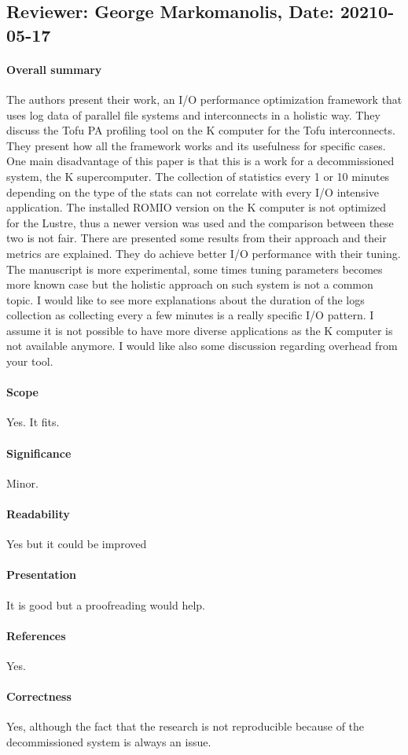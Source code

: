 \documentclass{jhps}
\begin{document}
                   
\subsection*{Reviewer: George Markomanolis, Date: 20210-05-17}
\paragraph{Overall summary}

The authors present their work, an I/O performance optimization framework that uses log data of parallel file systems and interconnects in a holistic way. They discuss the Tofu PA profiling tool on the K computer for the Tofu interconnects. They present how all the framework works and its usefulness for specific cases. One main disadvantage of this paper is that this is a work for a decommissioned system, the K supercomputer. The collection of statistics every 1 or 10 minutes depending on the type of the stats can not correlate with every I/O intensive application. The installed ROMIO version on the K computer is not optimized for the Lustre, thus a newer version was used and the comparison between these two is not fair. There are presented some results from their approach and their metrics are explained. They do achieve better I/O performance with their tuning.
The manuscript is more experimental, some times tuning parameters becomes more known case but the holistic approach on such system is not a common topic. I would like to see more explanations about the duration of the logs collection as collecting every a few minutes is a really specific I/O pattern. I assume it is not possible to have more diverse applications as the K computer is not available anymore. I would like also some discussion regarding overhead from your tool.
\paragraph{Scope}   %
Yes. It fits.
\paragraph{Significance}   %
Minor.
\paragraph{Readability}   %
Yes but it could be improved
\paragraph{Presentation}
It is good but a proofreading would help.
\paragraph{References}   %
Yes.
\paragraph{Correctness}   %
Yes, although the fact that the research is not reproducible because of the decommissioned system is always an issue.
\end{document}
